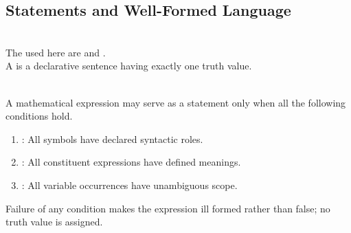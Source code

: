 \subsection{Statements and Well-Formed Language}

\begin{definition} \label{def:mathematical-statements-and-truth-values} \\
The  used here are  and .\\
A  is a declarative sentence having exactly one truth value.
\end{definition}

\begin{principle} \label{princ:well-formed-statements} \\
A mathematical expression may serve as a statement only when all the following conditions hold.
\begin{enumerate}[label=(\roman*)]
\setlength{\itemsep}{0pt}
\item {}: All symbols have declared syntactic roles.
\item {}: All constituent expressions have defined meanings.
\item {}: All variable occurrences have unambiguous scope.
\end{enumerate}
Failure of any condition makes the expression ill formed rather than false; no truth value is assigned.
\end{principle}
